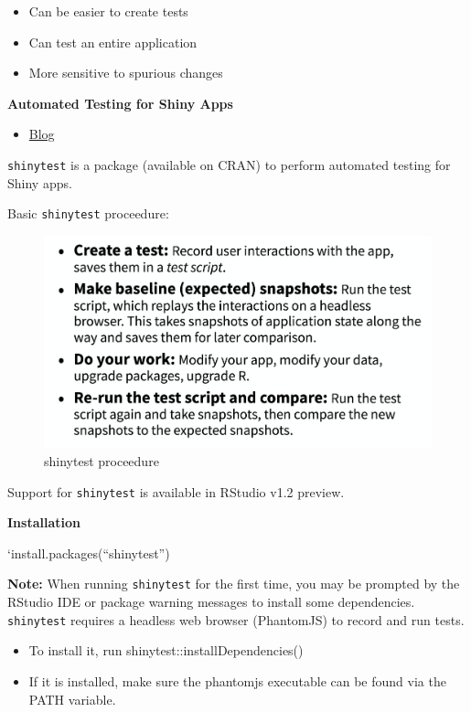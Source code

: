 \documentclass[]{book}
\providecommand{\tightlist}{%
  \setlength{\itemsep}{0pt}\setlength{\parskip}{0pt}}
\theoremstyle{definition}
\theoremstyle{definition}
\theoremstyle{definition}
\theoremstyle{remark}
\begin{document}
\begin{itemize}
\tightlist
\item
  Can be easier to create tests
\item
  Can test an entire application
\item
  More sensitive to spurious changes
\end{itemize}

\textbf{Automated Testing for Shiny Apps}

\begin{itemize}
\tightlist
\item
  \href{https://resources.rstudio.com/rstudio-blog/shinytest-automated-testing-for-shiny-apps}{Blog}
\end{itemize}

\texttt{shinytest} is a package (available on CRAN) to perform automated
testing for Shiny apps.

Basic \texttt{shinytest} proceedure:

\begin{figure}
\centering
\includegraphics{imgs/testing/testing-proceedure.png}
\caption{shinytest proceedure}
\end{figure}

Support for \texttt{shinytest} is available in RStudio v1.2 preview.

\textbf{Installation}

`install.packages(``shinytest'')

\textbf{Note:} When running \texttt{shinytest} for the first time, you
may be prompted by the RStudio IDE or package warning messages to
install some dependencies. \texttt{shinytest} requires a headless web
browser (PhantomJS) to record and run tests.

\begin{itemize}
\tightlist
\item
  To install it, run shinytest::installDependencies()
\item
  If it is installed, make sure the phantomjs executable can be found
  via the PATH variable.
\end{itemize}
\end{document}
